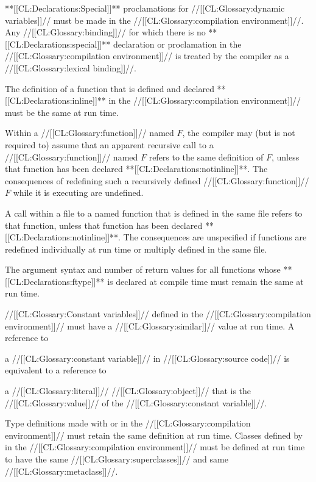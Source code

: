  \itemitem{\bull} **[[CL:Declarations:Special]]** proclamations for //[[CL:Glossary:dynamic variables]]// must be made in the //[[CL:Glossary:compilation environment]]//.  Any //[[CL:Glossary:binding]]// for which there is no **[[CL:Declarations:special]]** declaration or proclamation in the //[[CL:Glossary:compilation environment]]// is treated by the compiler as a //[[CL:Glossary:lexical binding]]//.

 \itemitem{\bull} The definition of a function that is defined and declared **[[CL:Declarations:inline]]** in the //[[CL:Glossary:compilation environment]]// must be the same at run time.
 

  
 \itemitem{\bull} Within a //[[CL:Glossary:function]]// named $F$, the compiler may (but is not required to) assume that an apparent recursive call to a //[[CL:Glossary:function]]// named $F$  refers to the same definition of $F$, unless that function has been declared **[[CL:Declarations:notinline]]**. The consequences of redefining such a recursively defined //[[CL:Glossary:function]]// $F$  while it is executing are undefined.

 \itemitem{\bull} A call within a file to a named function that is defined in the same file refers to that function, unless that function has been declared **[[CL:Declarations:notinline]]**.  The consequences are unspecified if functions are redefined individually at run time or multiply defined in the same file.

  
 \itemitem{\bull} The argument syntax and number of return values for all functions whose **[[CL:Declarations:ftype]]** is declared at compile time must remain the same at run time.
 

 \itemitem{\bull} //[[CL:Glossary:Constant variables]]// defined in the //[[CL:Glossary:compilation environment]]// must have a //[[CL:Glossary:similar]]// value at run time.  A reference to 

a //[[CL:Glossary:constant variable]]//  in //[[CL:Glossary:source code]]// is equivalent to a reference to 

a //[[CL:Glossary:literal]]// //[[CL:Glossary:object]]// that is the //[[CL:Glossary:value]]// of the //[[CL:Glossary:constant variable]]//.
 

 \itemitem{\bull} Type definitions made with  or  in the //[[CL:Glossary:compilation environment]]// must retain the same definition at run time.  Classes defined by  in the //[[CL:Glossary:compilation environment]]// must be defined at run time to have the same //[[CL:Glossary:superclasses]]// and same  //[[CL:Glossary:metaclass]]//.

